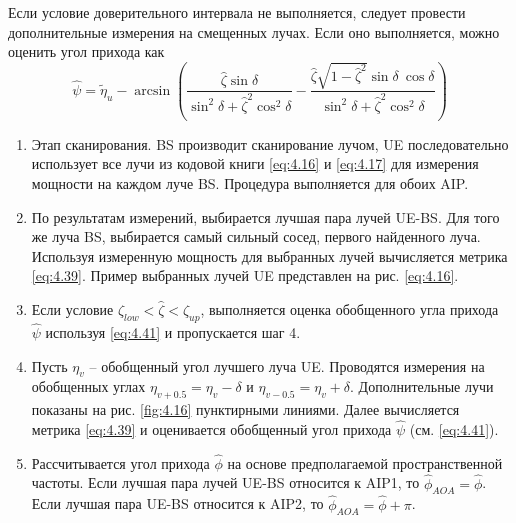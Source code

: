 Если условие доверительного интервала не выполняется, следует провести дополнительные измерения на смещенных лучах.
Если оно выполняется, можно оценить угол прихода как
\begin{equation}
    \label{eq:4.41}
    \hat \psi = \tilde \eta_u - \arcsin(
    \frac{\hat \zeta \sin\delta}{\sin^2\delta + \hat \zeta^2 \cos^2\delta} -
    \frac{\hat \zeta \sqrt{1- \hat \zeta^2} \sin\delta\ \cos\delta}{\sin^2\delta + \hat \zeta^2 \cos^2\delta}
    )
\end{equation}
\begin{enumerate}[label=\textbf{Шаг \arabic*:}]
    \item Этап сканирования. BS производит сканирование лучом, UE
          последовательно использует все лучи из кодовой книги \eqref{eq:4.16} и \eqref{eq:4.17} для
          измерения мощности на каждом луче BS. Процедура выполняется для обоих AIP.
    \item По результатам измерений, выбирается лучшая пара лучей UE-BS. Для того же луча BS,
          выбирается самый сильный сосед, первого найденного луча. Используя измеренную мощность для выбранных лучей
          вычисляется метрика \eqref{eq:4.39}. Пример выбранных лучей UE представлен на рис. \ref{eq:4.16}.
    \item Если условие $\zeta_{low} < \hat \zeta < \zeta_{up}$, выполняется оценка обобщенного угла прихода $\hat \psi$ используя \eqref{eq:4.41} и пропускается шаг 4.
    \item Пусть $\eta_v$ -- обобщенный угол лучшего луча UE. Проводятся измерения на обобщенных углах
          $\eta_{v+0.5} = \eta_v - \delta$ и
          $\eta_{v-0.5} = \eta_v + \delta$. Дополнительные лучи показаны на рис. \ref{fig:4.16} пунктирными линиями. Далее вычисляется метрика \eqref{eq:4.39}
          и оценивается обобщенный угол прихода $\hat \psi$ (см. \eqref{eq:4.41}).
    \item Рассчитывается угол прихода $\hat \phi$ на основе предполагаемой пространственной частоты. Если лучшая пара лучей UE-BS
          относится к AIP1, то $\hat \phi_{AOA} = \hat \phi$. Если лучшая пара UE-BS относится к AIP2, то $\hat \phi_{AOA} = \hat \phi + \pi$.
\end{enumerate}

